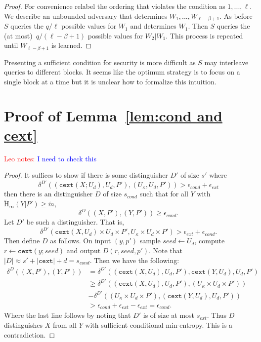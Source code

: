 \documentclass[11pt]{article}
\newcommand{\lemref}[1]{\mbox{Lemma~\ref{#1}}}
\newcommand{\Hav}{\tilde{\mathrm{H}}_\infty}
\newcommand{\cext}{\ensuremath{\mathtt{cext}}}
\newcommand{\authnote}[2]{{\textcolor{red}{\textsf{#1 notes: }\textcolor{blue}{ #2}}\marginpar{\textcolor{red}{\textbf{!!!!!}}}}}
\newcommand{\authnote}[2]{}
\newcommand{\lnote}[1]{{\authnote{Leo}{#1}}}
\begin{document}
\begin{proof}
For convenience relabel the ordering that violates the condition as $1,..., \ell$.  We describe an unbounded adversary that determines $W_1,..., W_{\ell-\beta+1}$.  As before $S$ queries the $q /\ell$ possible values for $W_1$ and determines $W_1$.  Then $S$ queries the (at most)~$q/(\ell-\beta+1)$ possible values for $W_2 | W_1$.  This process is repeated until $W_{\ell-\beta+1}$ is learned.
\end{proof}

Presenting a sufficient condition for security is more difficult as $S$ may interleave queries to different blocks.  It seems like the optimum strategy is to focus on a single block at a time but it is unclear how to formalize this intuition.


\section{Proof of \lemref{lem:cond and cext}}
\label{sec:cond and cext}
\lnote{I need to check this}
\begin{proof}
It suffices to show if there is some distinguisher $D'$ of size $s'$ where
\[\delta^{D'}((\cext(X; U_d), U_d, P'), (U_\kappa, U_d, P'))>\epsilon_{cond}+ \epsilon_{ext}\]
 then there is an distinguisher $D$ of size $s_{cond}$ such that for all $Y$ with $\Hav(Y|P') \geq \tilde{m}$,
 \[
 \delta^{D}((X,P'), (Y, P'))\geq \epsilon_{cond}.
 \]
Let $D'$ be such a distinguisher.  That is,
\[
\delta^{D'}(\cext(X, U_d)\times U_d \times P', U_\kappa\times U_d\times P')> \epsilon_{ext}+\epsilon_{cond}.
\]
Then define $D$ as follows.  On input $(y, p')$ sample $seed\leftarrow U_d$, compute $r\leftarrow \cext(y; seed)$ and output $D(r, seed, p')$.  Note that $|D| \approx s' + |\cext| +d= s_{cond}$.  Then we have the following:
\begin{align*}
\delta^{D}((X, P'), (Y, P'))&= \delta^{D'}((\cext(X, U_d), U_d, P'), \cext(Y, U_d), U_d, P')\\
&\geq \delta^{D'}((\cext(X, U_d), U_d, P'), (U_\kappa\times U_d \times P')) \\
&- \delta^{D'}((U_\kappa\times U_d \times P'), (\cext(Y, U_d), U_d, P'))\\
&>\epsilon_{cond}+\epsilon_{ext}- \epsilon_{ext} = \epsilon_{cond}.
\end{align*}
Where the last line follows by noting that $D'$ is of size at most $s_{ext}$.  Thus $D$ distinguishes $X$ from all $Y$ with sufficient conditional min-entropy.  This is a contradiction.
\end{proof}
\end{document}
